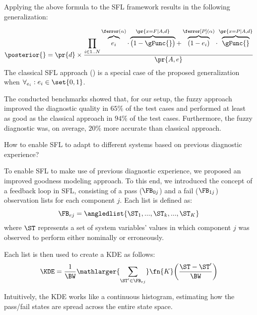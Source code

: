 Applying the above formula to the \ac{SFL} framework results in the
following generalization:

\begin{equation}
  \posterior{}   =  \pr{d} \times
  \frac{
    \displaystyle \prod_{i \in 1..N}
    \overbrace{\vphantom{\big(}e_i}^{\ferror(\alpha)} \cdot
    \overbrace{\vphantom{\big(}\big(1 - \gFunc{}\big)}^{\pr{x=F \mid A,d}} +
    \overbrace{\vphantom{\big(}(1-e_i)}^{\ferror[P](\alpha)} \cdot
    \overbrace{\vphantom{\big(}\gFunc{}}^{\pr{x=P \mid A,d}}}
  {\pr{A, e}}
\end{equation}
\noindent
The classical \ac{SFL} approach
() is a special case of the
proposed generalization when $\forall_{e_i} : e_i \in \set{0,1}$.

The conducted benchmarks showed that, for our setup, the fuzzy
approach improved the diagnostic quality in $65\%$ of the test cases
and performed at least as good as the classical approach in $94\%$ of
the test cases.
%
Furthermore, the fuzzy diagnostic was, on average, $20\%$ more
accurate than classical approach.

\begin{description}[leftmargin=!,labelwidth=\widthof{\bfseries \Cref{rq:optimizations} ---}]
\item [\Cref{rq:feedback} ---] How to enable \ac{SFL} to adapt to
  different systems based on previous diagnostic experience?
\end{description}

To enable \ac{SFL} to make use of previous diagnostic experience, we
proposed an improved goodness modeling approach.
%
To this end, we introduced the concept of a feedback loop in \ac{SFL},
consisting of a pass ($\FB_{0j}$) and a fail ($\FB_{1j}$) observation
lists for each component $j$.
%
Each list is defined as:
\begin{equation}
  \FB_{ej} = \angledlist{\ST_1, ...,  \ST_k, ..., \ST_K}
\end{equation}
\noindent
where $\ST$ represents a set of system variables' values in which
component $j$ was observed to perform either nominally or erroneously.

Each list is then used to create a \ac{KDE} as follows:
\begin{equation}
  \KDE = \frac {1}{\BW}{\mathlarger{\sum_{\ST^\prime \in \FB_{ej}}} \fn{K}\bigg(\frac{\ST - \ST^\prime}{\BW}\bigg)}
\end{equation}

Intuitively, the \ac{KDE} works like a continuous histogram,
estimating how the pass/fail states are spread across the entire state
space.

